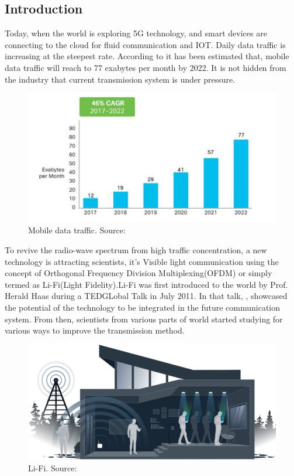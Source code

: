 \documentclass{article}
\begin{document}
\subsection{Introduction}

Today, when the world is exploring 5G technology, and smart devices are
connecting to the cloud for fluid communication and IOT.  Daily data traffic is
increasing at the steepest rate. According to \textcite{cisco19} it has been
estimated that, mobile data traffic will reach to 77 exabytes per month by
2022. It is not hidden from the industry that current transmission system is
under pressure.\\

\begin{figure}[!h]
  \includegraphics{res/traffic_trend_li_fi.PNG}
    \caption{Mobile data traffic. Source: \parencite{cisco19}}
  \label{fig:traffic_trend_li_fi}
\end{figure}


To revive the radio-wave spectrum from high traffic concentration, a new
technology is attracting scientists, it's Visible light communication using the
concept of Orthogonal Frequency Division Multiplexing(OFDM) or simply termed as
Li-Fi(Light Fidelity).\newline Li-Fi was first introduced to the world by Prof.
Herald Haas during a TEDGLobal Talk in July 2011. In that talk,
\textcite{hass11}, showcased the potential of the technology to be integrated
in the future communication system. From then, scientists from various parts of
world started studying for various ways to improve the transmission method.\\

\begin{figure}[!h]
  \includegraphics[width=\linewidth]{res/tech-illustration-li-fi.png}
    \caption{Li-Fi. Source: \parencite{purelifi}}
  \label{fig:tech-illustration-li-fi}
\end{figure}
\end{document}
